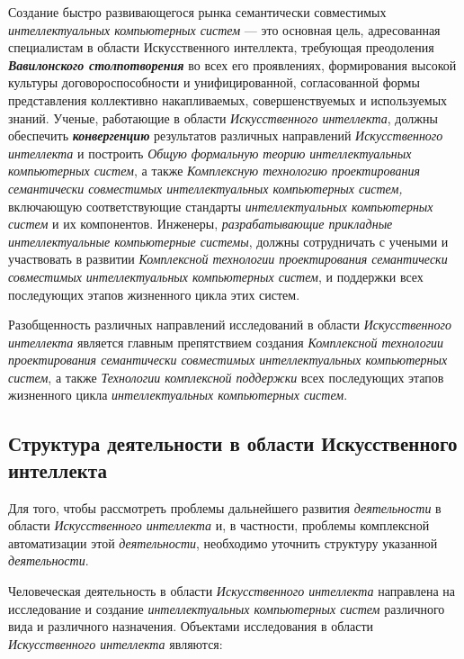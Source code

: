 Создание быстро развивающегося рынка семантически совместимых \textit{интеллектуальных компьютерных систем} --- это основная цель, адресованная специалистам в области Искусственного интеллекта, требующая преодоления \textbf{\textit{Вавилонского столпотворения}} во всех его проявлениях, формирования высокой культуры договороспособности и унифицированной, согласованной формы представления коллективно накапливаемых, совершенствуемых и используемых знаний. Ученые, работающие в области \textit{Искусственного интеллекта}, должны обеспечить \textbf{\textit{конвергенцию}} результатов различных направлений \textit{Искусственного интеллекта} и построить \textit{Общую формальную теорию интеллектуальных компьютерных систем}, а также \textit{Комплексную технологию проектирования семантически совместимых интеллектуальных компьютерных систем,} включающую соответствующие стандарты \textit{интеллектуальных компьютерных систем} и их компонентов. Инженеры, \textit{разрабатывающие прикладные интеллектуальные компьютерные системы}, должны сотрудничать с учеными и участвовать в развитии \textit{Комплексной технологии проектирования семантически совместимых интеллектуальных компьютерных систем}, и поддержки всех последующих этапов жизненного цикла этих систем.

Разобщенность различных направлений исследований в области \textit{Искусственного интеллекта} является главным препятствием создания \textit{Комплексной технологии проектирования семантически совместимых интеллектуальных компьютерных систем}, а также \textit{Технологии комплексной поддержки} всех последующих этапов жизненного цикла \textit{интеллектуальных компьютерных систем}.

\subsection{Структура деятельности в области Искусственного интеллекта}
\label{subsec_activity_structure}

Для того, чтобы рассмотреть проблемы дальнейшего развития \textit{деятельности} в области \textit{Искусственного интеллекта} и, в частности, проблемы комплексной автоматизации этой \textit{деятельности}, необходимо уточнить структуру указанной \textit{деятельности}.

Человеческая деятельность в области \textit{Искусственного интеллекта} направлена на исследование и создание \textit{интеллектуальных компьютерных систем} различного вида и различного назначения. Объектами исследования в области \textit{Искусственного интеллекта} являются:

